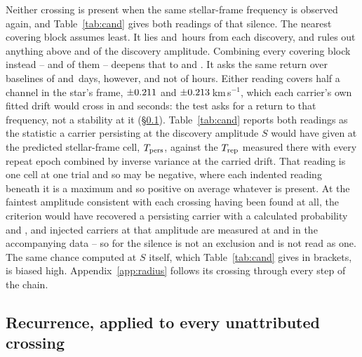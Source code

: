 Neither crossing is present when the same stellar-frame frequency is observed
again, and Table~\ref{tab:cand} gives both readings of that silence. The nearest covering block assumes least. It lies \RcSxNearH{} and
\EvBDeepH\,hours from each discovery, and rules out anything above
\RqNearFracSx{} and \RqNearFracCp{} of the discovery amplitude. Combining every covering block instead -- \RqNRepSx{} and \RqNRepCp{} of
them -- deepens that to \RcSxFive{} and \RcCpFive. It asks the same return
over baselines of \RqSpanDSx{} and \RqSpanDCp\,days, however, and not of
hours. Either
reading covers half a channel in the star's frame, $\pm0.211$ and
$\pm0.213$\,km\,s$^{-1}$, which each carrier's own fitted drift would
cross in \ZtSxLeaveSec{} and \ZtCpLeaveSec{} seconds: the
test asks for a return to that frequency, not a stability at
it (\S\ref{sec:etacrv}). Table~\ref{tab:cand} reports both readings as the
statistic a carrier persisting at the discovery amplitude $S$ would have
given at the predicted stellar-frame cell, $T_{\rm pers}$, against the
$T_{\rm rep}$ measured there with every repeat epoch combined by inverse
variance at the carried drift. That reading is one cell at one trial and so
may be negative, where each indented reading beneath it is a maximum and so
positive on average whatever is present. At the faintest amplitude consistent with each crossing
having been found at all, the criterion would have recovered a persisting
carrier with a calculated probability \RqPowerTrigSx{} and
\RqPowerTrigCp{}, and injected carriers at that amplitude are measured at
\HjMeasSx{} and \HjMeasCp{} in the accompanying data -- so for
\EvBStar{} the silence is not an exclusion and is not read as one. The same
chance computed at $S$ itself, which Table~\ref{tab:cand} gives in brackets,
is biased high.
Appendix~\ref{app:radius} follows its crossing through every step
of the chain.


\subsection{Recurrence, applied to every unattributed crossing}
\label{sec:etacrv}

